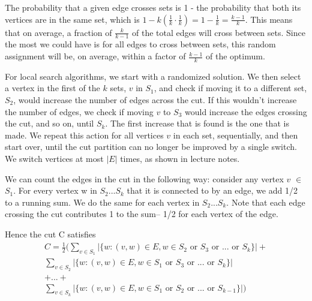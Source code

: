 \documentclass[11pt]{article}
\begin{document}
The probability that a given edge crosses sets is 1 - the probability that both its vertices are in the same set, which is $1- k(\frac{1}{k}\cdot\frac{1}{k})= 1 - \frac{1}{k} = \frac{k-1}{k}$. This means that on average, a fraction of $\frac{k}{k-1}$ of the total edges will cross between sets. Since the most we could have is for all edges to cross between sets, this random assignment will be, on average, within a factor of $\frac{k-1}{k}$ of the optimum.

For local search algorithms, we start with a randomized solution. We then select a vertex in the first of the $k$ sets, $v$ in $S_1$, and check if moving it to a different set, $S_2$, would increase the number of edges across the cut. If this wouldn't increase the number of edges, we check if moving $v$ to $S_3$ would increase the edges crossing the cut, and so on, until $S_k$. The first increase that is found is the one that is made. We repeat this action for all vertices $v$ in each set, sequentially, and then start over, until the cut partition can no longer be improved by a single switch. We switch vertices at most $|E|$ times, as shown in lecture notes. 

We can count the edges in the cut in the following way: consider any vertex $v$ $\in$ $S_1$. For every vertex w in $S_2...S_k$ that it is connected to by an edge, we add 1/2 to a running sum. We do the same for each vertex in $S_2...S_k$. Note that each edge crossing the cut contributes 1 to the sum– 1/2 for each vertex of the edge.

Hence the cut C satisfies
\begin{multline*}
	C= \frac{1}{2} (\sum_{v\in S_1}|\{w:(v,w)\in E, w \in S_2 \text{ or } S_3 \text{ or } ... \text{ or } S_k\}|+ \\
	\sum_{v\in S_2}|\{w:(v,w) \in E, w \in S_1\text{ or } S_3 \text{ or } ... \text{ or } S_k\}| \\
	+ ... + \\ 
	\sum_{v\in S_k}|\{w:(v,w) \in E, w \in S_1\text{ or } S_2 \text{ or } ... \text{ or } S_{k-1}\}|)
\end{multline*}
\end{document}
